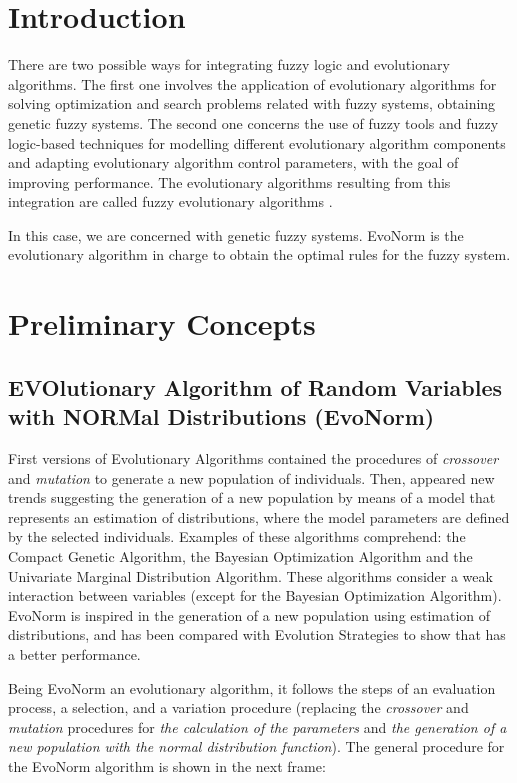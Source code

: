 \documentclass{sig-alternate-05-2015}
\begin{document}
\section{Introduction}

There are two possible ways for integrating fuzzy logic and evolutionary algorithms. The first one involves the application of evolutionary algorithms for solving optimization and search problems related with fuzzy systems, obtaining genetic fuzzy systems. The second one concerns the use of fuzzy tools and fuzzy logic-based techniques for modelling different evolutionary algorithm components and adapting evolutionary algorithm control parameters, with the goal of improving performance. The evolutionary algorithms resulting from this integration are called fuzzy evolutionary algorithms \cite{mumford:intelligentsystems}.

In this case, we are concerned with genetic fuzzy systems. EvoNorm is the evolutionary algorithm in charge to obtain the optimal rules for the fuzzy system.

\section{Preliminary Concepts}
\subsection{EVOlutionary Algorithm of Random Variables with NORMal
Distributions (EvoNorm)}

First versions of Evolutionary Algorithms contained the procedures of \textit{crossover} and \textit{mutation} to generate a new population of individuals. Then, appeared new trends suggesting the generation of a new population by means of a model that represents an estimation of distributions, where the model parameters are defined by the selected individuals. Examples of these algorithms comprehend: the Compact Genetic Algorithm, the Bayesian Optimization Algorithm and the Univariate Marginal Distribution Algorithm. These algorithms consider a weak interaction between variables (except for the Bayesian Optimization Algorithm). EvoNorm is inspired in the generation of a new population using estimation of distributions, and has been compared with Evolution Strategies to show that has a better performance. \cite{torres:evonorm}

Being EvoNorm an evolutionary algorithm, it follows the steps of an evaluation process, a selection, and a variation procedure (replacing the \textit{crossover} and \textit{mutation} procedures for \textit{the calculation of the parameters} and \textit{the generation of a new population with the normal distribution function}). The general procedure for the EvoNorm algorithm is shown in the next frame:
\end{document}

